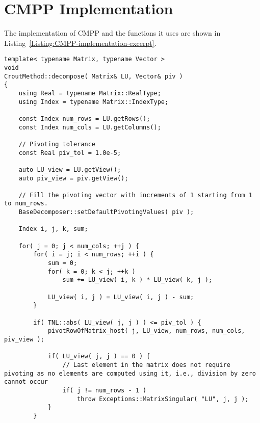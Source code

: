 \newpage 									%
\appendix

\chapter{CMPP Implementation}\label{Appendix:CMPP-implementation}
The implementation of CMPP and the functions it uses are shown in Listing~\ref{Listing:CMPP-implementation-excerpt}.

\begin{lstlisting}[caption={Excerpt from the implementation of CMPP.
The \code{pivotRowOfMatrix\_host()} function, presented below the \code{decompose()} method, is implemented in the parent class of \code{CroutMethod}: \code{BaseDecomposer}.
Note that the code has been slightly modified for brevity.
For example, the \code{swapRows\_host()} function has been omitted as it is a basic operation, and the checks for appropriate sizing of matrices/vectors have been removed.},label={Listing:CMPP-implementation-excerpt}]
template< typename Matrix, typename Vector >
void
CroutMethod::decompose( Matrix& LU, Vector& piv )
{
	using Real = typename Matrix::RealType;
	using Index = typename Matrix::IndexType;
	
	const Index num_rows = LU.getRows();
	const Index num_cols = LU.getColumns();
	
	// Pivoting tolerance
	const Real piv_tol = 1.0e-5;
	
	auto LU_view = LU.getView();
	auto piv_view = piv.getView();
	
	// Fill the pivoting vector with increments of 1 starting from 1 to num_rows.
	BaseDecomposer::setDefaultPivotingValues( piv );
	
	Index i, j, k, sum;
	
	for( j = 0; j < num_cols; ++j ) {
		for( i = j; i < num_rows; ++i ) {
			sum = 0;
			for( k = 0; k < j; ++k )
				sum += LU_view( i, k ) * LU_view( k, j );
			
			LU_view( i, j ) = LU_view( i, j ) - sum;
		}
		
		if( TNL::abs( LU_view( j, j ) ) <= piv_tol ) {
			pivotRowOfMatrix_host( j, LU_view, num_rows, num_cols, piv_view );
			
			if( LU_view( j, j ) == 0 ) {
				// Last element in the matrix does not require pivoting as no elements are computed using it, i.e., division by zero cannot occur
				if( j != num_rows - 1 )
					throw Exceptions::MatrixSingular( "LU", j, j );
			}
		}
		

\end{lstlisting}
